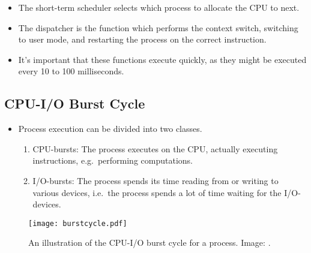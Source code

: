 \documentclass{beamer}
\begin{document}
\begin{frame}{\insertsubsectionhead}
  \begin{itemize}
    \item The short-term scheduler selects which process to allocate the CPU to 
      next.

    \item The dispatcher is the function which performs
      the context switch,
      switching to user mode,
      and restarting the process on the correct instruction.

    \item It's important that these functions execute quickly, as they might be 
      executed every 10 to 100 milliseconds.

  \end{itemize}
\end{frame}

\subsection{CPU-I/O Burst Cycle}

\begin{frame}{\insertsubsectionhead}
  \begin{itemize}
    \item Process execution can be divided into two classes.
      \begin{enumerate}
        \item CPU-bursts:
          The process executes on the CPU, actually executing instructions, 
          e.g.\ performing computations.

        \item I/O-bursts:
          The process spends its time reading from or writing to various 
          devices, i.e.\ the process spends a lot of time waiting for the 
          I/O-devices.

      \end{enumerate}
  \end{itemize}
\end{frame}

\begin{frame}{\insertsubsectionhead}
  \begin{figure}
    \texttt{[image: burstcycle.pdf]}
    \caption{An illustration of the CPU-I/O burst cycle for a process.
      Image: \cite{Silberschatz2013osc}.}
  \end{figure}
\end{frame}
\end{document}
